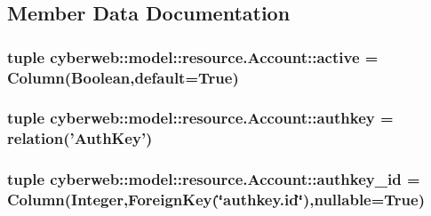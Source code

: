 \subsection{\-Member \-Data \-Documentation}
\hypertarget{classcyberweb_1_1model_1_1resource_1_1_account_ae17fca9bef83cd8b859d3c1e7bb20b58}{
\subsubsection[{active}]{\setlength{\rightskip}{0pt plus 5cm}tuple {\bf cyberweb\-::model\-::resource.\-Account\-::active} = \-Column(\-Boolean,default=\-True)}}\label{classcyberweb_1_1model_1_1resource_1_1_account_ae17fca9bef83cd8b859d3c1e7bb20b58}
\hypertarget{classcyberweb_1_1model_1_1resource_1_1_account_aade0db1ce4672b3c0ee0330c2ce9cd03}{
\subsubsection[{authkey}]{\setlength{\rightskip}{0pt plus 5cm}tuple {\bf cyberweb\-::model\-::resource.\-Account\-::authkey} = relation('{\bf \-Auth\-Key}')}}\label{classcyberweb_1_1model_1_1resource_1_1_account_aade0db1ce4672b3c0ee0330c2ce9cd03}
\hypertarget{classcyberweb_1_1model_1_1resource_1_1_account_a6e7586c94ea99929ecf68f724484b83a}{
\subsubsection[{authkey\-\_\-id}]{\setlength{\rightskip}{0pt plus 5cm}tuple {\bf cyberweb\-::model\-::resource.\-Account\-::authkey\-\_\-id} = \-Column(\-Integer,\-Foreign\-Key(\char`\"{}authkey.\-id\char`\"{}),nullable=\-True)}}\label{classcyberweb_1_1model_1_1resource_1_1_account_a6e7586c94ea99929ecf68f724484b83a}
